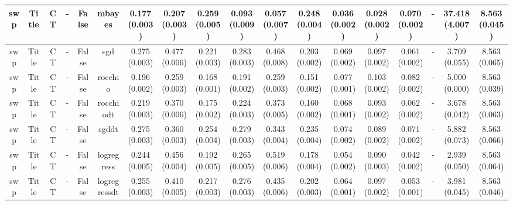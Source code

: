 \documentclass{article}
\begin{document}
{\begin{landscape}
\begin{table}[!h]
{\begin{tabular}{@{}cccccccccccccccccc@{}}
\midrule swp & Title & CT & - & False & mbayes & 0.177 (0.003) & 0.207 (0.003) & 0.259 (0.005) & 0.093 (0.009) & 0.057 (0.007) & 0.248 (0.004) & 0.036 (0.002) & 0.028 (0.002) & 0.070 (0.002) &- & 37.418 (4.007) & 8.563 (0.045)\\
\midrule swp & Title & CT & - & False & sgd & 0.275 (0.003) & 0.477 (0.006) & 0.221 (0.003) & 0.283 (0.003) & 0.468 (0.008) & 0.203 (0.002) & 0.069 (0.002) & 0.097 (0.002) & 0.061 (0.002) &- & 3.709 (0.055) & 8.563 (0.065)\\
\midrule swp & Title & CT & - & False & rocchio & 0.196 (0.002) & 0.259 (0.003) & 0.168 (0.001) & 0.191 (0.002) & 0.259 (0.003) & 0.151 (0.002) & 0.077 (0.001) & 0.103 (0.002) & 0.082 (0.002) &- & 5.000 (0.000) & 8.563 (0.039)\\
\midrule swp & Title & CT & - & False & rocchiodt & 0.219 (0.003) & 0.370 (0.006) & 0.175 (0.002) & 0.224 (0.003) & 0.373 (0.005) & 0.160 (0.002) & 0.068 (0.001) & 0.093 (0.002) & 0.062 (0.002) &- & 3.678 (0.042) & 8.563 (0.063)\\
\midrule swp & Title & CT & - & False & sgddt & 0.275 (0.003) & 0.360 (0.003) & 0.254 (0.004) & 0.279 (0.003) & 0.343 (0.004) & 0.235 (0.004) & 0.074 (0.002) & 0.089 (0.002) & 0.071 (0.002) &- & 5.882 (0.073) & 8.563 (0.066)\\
\midrule swp & Title & CT & - & False & logregress & 0.244 (0.005) & 0.456 (0.004) & 0.192 (0.005) & 0.265 (0.005) & 0.519 (0.006) & 0.178 (0.004) & 0.054 (0.002) & 0.090 (0.003) & 0.042 (0.002) &- & 2.939 (0.050) & 8.563 (0.064)\\
\midrule swp & Title & CT & - & False & logregressdt & 0.255 (0.003) & 0.410 (0.005) & 0.217 (0.003) & 0.276 (0.003) & 0.435 (0.006) & 0.202 (0.003) & 0.064 (0.001) & 0.097 (0.002) & 0.053 (0.001) &- & 3.981 (0.045) & 8.563 (0.046)\\

                          \end{tabular}}
                          \end{table}


\end{landscape}}
\end{document}
